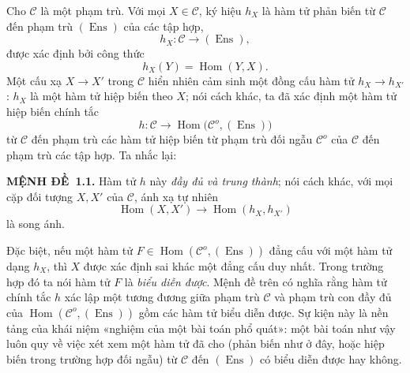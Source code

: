 \documentclass[11pt,twoside,openany]{book}
\numberwithin{equation}{section}
\newcommand{\result}[2]{\par\medskip\noindent\textbf{#1\if\relax\detokenize{#2}\relax\else\ #2\fi.}\quad}
\begin{document}
Cho $\mathcal C$ là một phạm trù. Với mọi $X\in\mathcal C$, ký hiệu $h_X$ là
hàm tử phản biến từ $\mathcal C$ đến phạm trù $(\operatorname{Ens})$ của các
tập hợp,
\[
  h_X:\mathcal C\longrightarrow(\operatorname{Ens}),
\]
được xác định bởi công thức
\[
  h_X(Y)=\operatorname{Hom}(Y,X).
\]
Một cấu xạ $X\longrightarrow X'$ trong $\mathcal C$ hiển nhiên cảm sinh một
đồng cấu hàm tử $h_X\longrightarrow h_{X'}$: $h_X$ là một hàm tử hiệp biến
theo $X$; nói cách khác, ta đã xác định một hàm tử hiệp biến chính tắc
\[
  h:\mathcal C\longrightarrow
  \operatorname{Hom}\bigl(\mathcal C^o,(\operatorname{Ens})\bigr)
\]
từ $\mathcal C$ đến phạm trù các hàm tử hiệp biến từ phạm trù đối ngẫu
$\mathcal C^o$ của $\mathcal C$ đến phạm trù các tập hợp. Ta nhắc lại:

\result{MỆNH ĐỀ}{1.1} Hàm tử $h$ này \emph{đầy đủ và trung thành}; nói cách
khác, với mọi cặp đối tượng $X,X'$ của $\mathcal C$, ánh xạ tự nhiên
\[
  \operatorname{Hom}(X,X')\longrightarrow
  \operatorname{Hom}(h_X,h_{X'})
\]
là song ánh.

Đặc biệt, nếu một hàm tử
$F\in\operatorname{Hom}(\mathcal C^o,(\operatorname{Ens}))$ đẳng cấu với một
hàm tử dạng $h_X$, thì $X$ được xác định sai khác một đẳng cấu duy nhất.
Trong trường hợp đó ta nói hàm tử $F$ là \emph{biểu diễn được}. Mệnh đề trên
có nghĩa rằng hàm tử chính tắc $h$ xác lập một tương đương giữa phạm trù
$\mathcal C$ và phạm trù con đầy đủ của
$\operatorname{Hom}(\mathcal C^o,(\operatorname{Ens}))$ gồm các hàm tử biểu
diễn được. Sự kiện này là nền tảng của khái niệm «nghiệm của một bài toán phổ
quát»: một bài toán như vậy luôn quy về việc xét xem một hàm tử đã cho
(phản biến như ở đây, hoặc hiệp biến trong trường hợp đối ngẫu) từ
$\mathcal C$ đến $(\operatorname{Ens})$ có biểu diễn được hay không.
\end{document}
